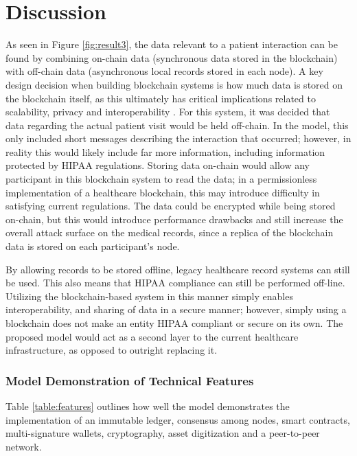 \documentclass[12pt]{report}
\begin{document}
\section{Discussion}
As seen in Figure \ref{fig:result3}, the data relevant to a patient interaction can be found by combining on-chain data (synchronous data stored in the blockchain) with off-chain data (asynchronous local records stored in each node). A key design decision when building blockchain systems is how much data is stored on the blockchain itself, as this ultimately has critical implications related to scalability, privacy and interoperability \cite{Dufel.2016}. For this system, it was decided that data regarding the actual patient visit would be held off-chain. In the model, this only included short messages describing the interaction that occurred; however, in reality this would likely include far more information, including information protected by HIPAA regulations. Storing data on-chain would allow any participant in this blockchain system to read the data; in a permissionless implementation of a healthcare blockchain, this may introduce difficulty in satisfying current regulations. The data could be encrypted while being stored on-chain, but this would introduce performance drawbacks and still increase the overall attack surface on the medical records, since a replica of the blockchain data is stored on each participant's node. 

By allowing records to be stored offline, legacy healthcare record systems can still be used. This also means that HIPAA compliance can still be performed off-line. Utilizing the blockchain-based system in this manner simply enables interoperability, and sharing of data in a secure manner; however, simply using a blockchain does not make an entity HIPAA compliant or secure on its own. %
The proposed model would act as a second layer to the current healthcare infrastructure, as opposed to outright replacing it. 

\subsubsection{Model Demonstration of Technical Features}
Table \ref{table:features} outlines how well the model demonstrates the implementation of an immutable ledger, consensus among nodes, smart contracts, multi-signature wallets, cryptography, asset digitization and a peer-to-peer network. 
\end{document}
